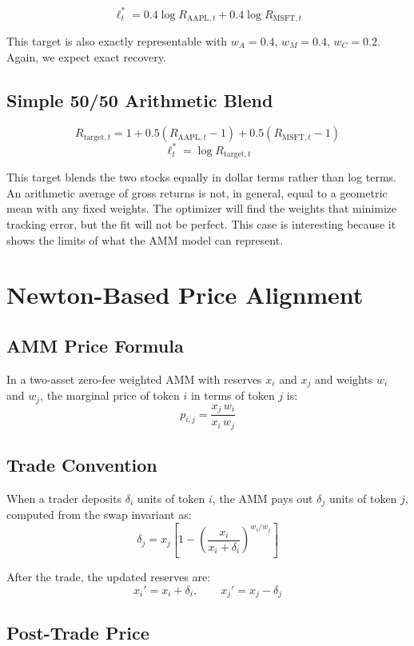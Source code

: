\documentclass[12pt]{article}
\begin{document}
\[
\ell_t^* = 0.4 \log R_{\text{AAPL},t} + 0.4 \log R_{\text{MSFT},t}
\]

This target is also exactly representable with $w_A = 0.4$, $w_M = 0.4$, $w_C = 0.2$. Again, we expect exact recovery.

\subsection*{Simple 50/50 Arithmetic Blend}

\[
R_{\text{target},t} = 1 + 0.5(R_{\text{AAPL},t} - 1) + 0.5(R_{\text{MSFT},t} - 1)
\]
\[
\ell_t^* = \log R_{\text{target},t}
\]

This target blends the two stocks equally in dollar terms rather than log terms. An arithmetic average of gross returns is not, in general, equal to a geometric mean with any fixed weights. The optimizer will find the weights that minimize tracking error, but the fit will not be perfect. This case is interesting because it shows the limits of what the AMM model can represent.

\section{Newton-Based Price Alignment}

\subsection*{AMM Price Formula}

In a two-asset zero-fee weighted AMM with reserves $x_i$ and $x_j$ and weights $w_i$ and $w_j$, the marginal price of token $i$ in terms of token $j$ is:
\[
p_{i,j} = \frac{x_j \, w_i}{x_i \, w_j}
\]

\subsection*{Trade Convention}

When a trader deposits $\delta_i$ units of token $i$, the AMM pays out $\delta_j$ units of token $j$, computed from the swap invariant as:
\[
\delta_j = x_j \left[1 - \left(\frac{x_i}{x_i + \delta_i}\right)^{w_i / w_j}\right]
\]

After the trade, the updated reserves are:
\[
x_i' = x_i + \delta_i, \qquad x_j' = x_j - \delta_j
\]

\subsection*{Post-Trade Price}
\end{document}
